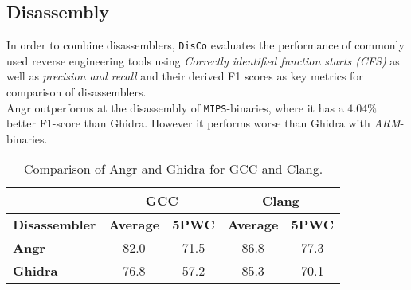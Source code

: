 \documentclass[seminar]{plai}
\begin{document}
\begin{table}[h]
\centering
{}
\caption{Comparison of Angr and Ghidra for Recompile Success Rate and Coverage Equivalence Rate.\cite{decompileBench-comprehensice-benchmark-for-evaluating-decompilers-in-real-world-scenarios}}
\label{sec:decompileBench-comparison}
\end{table}

\subsection{Disassembly}
In order to combine disassemblers, \texttt{DisCo} evaluates the performance of commonly used reverse engineering tools using \textit{Correctly identified function starts (CFS)} as well as \textit{precision and recall} and their derived F1 scores as key metrics for comparison of disassemblers.\\
Angr outperforms at the disassembly of \texttt{MIPS}-binaries, where it has a $4.04\%$ better F1-score than Ghidra.
However it performs worse than Ghidra with \textit{ARM}-binaries.
\begin{table}[H]
\centering
\begin{tabular}{|l|c|c||c|c|}
\hline
 & \multicolumn{2}{c||}{\textbf{GCC}} & \multicolumn{2}{c|}{\textbf{Clang}} \\
\hline
\textbf{Disassembler} & \textbf{Average} & \textbf{5PWC} & \textbf{Average} & \textbf{5PWC} \\
\hline
\textbf{Angr}   & 82.0 & 71.5 & 86.8 & 77.3 \\
\hline
\textbf{Ghidra} & 76.8 & 57.2 & 85.3 & 70.1 \\
\hline
\end{tabular}
\caption{Comparison of Angr and Ghidra for GCC and Clang.\cite{DisCo-combining-disassemblers-for-improved-performance}}
\end{table}
\end{document}
